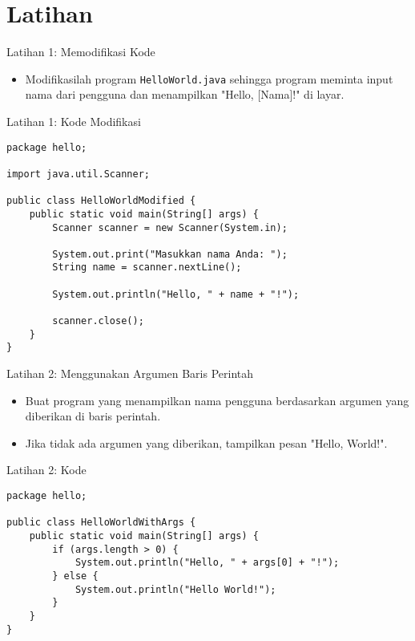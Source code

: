 \documentclass[aspectratio=169, table]{beamer}
\begin{document}
\section{Latihan}
\begin{frame}[fragile]{Latihan 1: Memodifikasi Kode}
\begin{itemize}
\item Modifikasilah program \texttt{HelloWorld.java} sehingga program meminta input nama dari pengguna dan menampilkan "Hello, [Nama]!" di layar.
\end{itemize}
\end{frame}

\begin{frame}[fragile]{Latihan 1: Kode Modifikasi}
\begin{lstlisting}[style=JavaStyle]
package hello;

import java.util.Scanner;

public class HelloWorldModified {
	public static void main(String[] args) {
		Scanner scanner = new Scanner(System.in);
		
		System.out.print("Masukkan nama Anda: ");
		String name = scanner.nextLine();
		
		System.out.println("Hello, " + name + "!");
		
		scanner.close();
	}
}
\end{lstlisting}
\end{frame}

\begin{frame}[fragile]{\LARGE{Latihan 2: Menggunakan Argumen Baris Perintah}}
\begin{itemize}
\item Buat program yang menampilkan nama pengguna berdasarkan argumen yang diberikan di baris perintah.
\item Jika tidak ada argumen yang diberikan, tampilkan pesan "Hello, World!".
\end{itemize}
\end{frame}

\begin{frame}[fragile]{Latihan 2: Kode}
\begin{lstlisting}[style=JavaStyle]
package hello;

public class HelloWorldWithArgs {
	public static void main(String[] args) {
		if (args.length > 0) {
			System.out.println("Hello, " + args[0] + "!");
		} else {
			System.out.println("Hello World!");
		}
	}
}
\end{lstlisting}
\end{frame}
\end{document}
